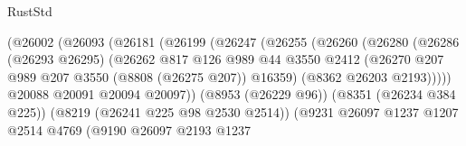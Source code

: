 \begin{lexlean}{RustStd}
\begin{coremodule}
                                        (@26002
                                          (@26093
                                            (@26181
                                              (@26199
                                                (@26247
                                                  (@26255
                                                    (@26260
                                                      (@26280
                                                        (@26286
                                                          (@26293 @26295)
                                                          (@26262
                                                            @817
                                                            @126
                                                            @989
                                                            @44
                                                            @3550
                                                            @2412
                                                            (@26270
                                                              @207
                                                              @989
                                                              @207
                                                              @3550
                                                              (@8808 (@26275 @207))
                                                              @16359)
                                                            (@8362 @26203 @2193)))))
                                                    @20088
                                                    @20091
                                                    @20094
                                                    @20097))
                                                (@8953 (@26229 @96))
                                                (@8351 (@26234 @384 @225))
                                                (@8219 (@26241 @225 @98 @2530 @2514))
                                                (@9231
                                                  @26097
                                                  @1237
                                                  @1207
                                                  @2514
                                                  @4769
                                                  (@9190
                                                    @26097
                                                    @2193
                                                    @1237

\end{coremodule}
\end{lexlean}
